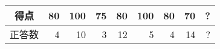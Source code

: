 \documentclass[12pt]{jarticle}
\begin{document}
\begin{table}[h]
\begin{center}
\begin{tabular}{|c|r|r|r|r|r|r|r|r|}
            得点                         & 80                            & 100                           & 75                            & 80                            & 100                           & 80                            & 70                            & ?                             \\ \hline
            正答数                       & 4                             & 10                            & 3                             & 12                            & 5                             & 4                             & 14                            & ?                             \\ \hline
        \end{tabular}
    \end{center}
\end{table}
\clearpage
\end{document}
